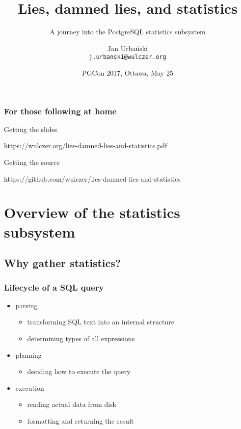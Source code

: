 \documentclass{beamer}
\title{Lies, damned lies, and statistics}
\subtitle{A journey into the PostgreSQL statistics subsystem}
\author[Jan Urbański]{Jan Urbański \\ \texttt{j.urbanski@wulczer.org}}
\institute{New Relic}
\date[PGCon 2017]{PGCon 2017, Ottawa, May 25}
\begin{document}
\frame{\titlepage}

\begin{frame}
  \frametitle{For those following at home}

  \begin{block}{Getting the slides}
    \begin{center}
      https://wulczer.org/lies-damned-lies-and-statistics.pdf
    \end{center}
  \end{block}

  \begin{block}{Getting the source}
    \begin{center}
      https://github.com/wulczer/lies-damned-lies-and-statistics
    \end{center}
  \end{block}
\end{frame}

\begin{frame}
  \tableofcontents
\end{frame}

\section{Overview of the statistics subsystem}
\subsection{Why gather statistics?}

\begin{frame}
  \frametitle{Lifecycle of a SQL query}

  \begin{itemize}
  \item<1> parsing
    \begin{itemize}
    \item \alert<1>{transforming SQL text} into an internal structure
    \item determining types of all expressions
    \end{itemize}
  \item<1-2> \alert<2>{planning}
    \begin{itemize}
    \item \alert<2>{deciding \alert<1>{how to execute} the query}
    \end{itemize}
  \item<1> execution
    \begin{itemize}
    \item \alert<1>{reading actual data} from disk
    \item formatting and returning the result
    \end{itemize}
  \end{itemize}
\end{frame}
\end{document}

